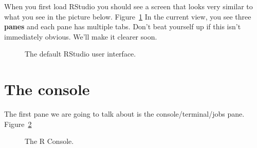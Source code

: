 \documentclass[
  letterpaper,
  DIV=11,
  numbers=noendperiod]{scrreprt}
\begin{document}
When you first load RStudio you should see a screen that looks very
similar to what you see in the picture below. Figure~\ref{fig-rstudio}
In the current view, you see three \textbf{panes} and each pane has
multiple tabs. Don't beat yourself up if this isn't immediately obvious.
We'll make it clearer soon.

\begin{figure}


\caption{\label{fig-rstudio}The default RStudio user interface.}

\end{figure}%

\section{The console}\label{the-console}

The first pane we are going to talk about is the console/terminal/jobs
pane. Figure~\ref{fig-console}

\begin{figure}


\caption{\label{fig-console}The R Console.}

\end{figure}%
\end{document}
